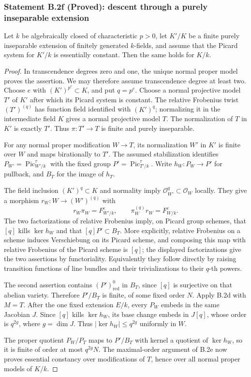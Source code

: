 \subsubsection*{Statement B.2f (Proved): descent through a purely inseparable extension}
Let $k$ be algebraically closed of characteristic $p>0$, let $K'/K$
be a finite purely inseparable extension of finitely generated
$k$-fields, and assume that the Picard system for $K'/k$ is
essentially constant.  Then the same holds for $K/k$.
\begin{proof}
In transcendence degrees zero and one, the unique normal proper model
proves the assertion.  We may therefore assume transcendence degree at
least two.  Choose $e$ with $(K')^{p^e}\subset K$, and put $q=p^e$.
Choose a normal projective model $T'$ of $K'$ after which its
Picard system is constant.  The relative Frobenius twist
$(T')^{(q)}$ has function field identified with $(K')^q$;
normalizing it in the intermediate field $K$ gives a normal
projective model $T$.  The normalization of $T$ in $K'$ is
exactly $T'$.  Thus $\pi:T'\to T$ is finite and purely inseparable.

For any normal proper modification $W\to T$, its normalization
$W'$ in $K'$ is finite over $W$ and maps birationally to $T'$.
The assumed stabilization identifies
$P_{W'}=\operatorname{Pic}^{\tau}_{W'/k}$ with the fixed group
$P'=\operatorname{Pic}^{\tau}_{T'/k}$.  Write
$h_W:P_W\to P'$ for pullback, and $B_T$ for the image of $h_T$.

The field inclusion $(K')^q\subset K$ and normality imply
$\mathcal O_{W'}^q\subset\mathcal O_W$ locally.  They give a
morphism $r_W:W\to(W')^{(q)}$ with
\[
 r_W\pi_W=F^e_{W'/k},\qquad
 \pi_W^{(q)}r_W=F^e_{W/k}.
\]
The two factorizations of relative Frobenius imply, on Picard
group schemes, that $[q]$ kills $\ker h_W$ and that
$[q]P'\subset B_T$.  More explicitly, relative Frobenius on a
scheme induces Verschiebung on its Picard scheme, and composing
this map with relative Frobenius of the Picard scheme is $[q]$;
the displayed factorizations give the two assertions by
functoriality.  Equivalently they follow directly by raising
transition functions of line bundles and their trivializations
to their $q$-th powers.

The second assertion contains $(P')_{\mathrm{red}}^0$ in $B_T$,
since $[q]$ is surjective on that abelian variety.  Therefore
$P'/B_T$ is finite, of some fixed order $N$.
Apply B.2d with $M=T$.  After the one fixed extension $E/k$,
every $P_W$ embeds in the same Jacobian $J$.  Since $[q]$
kills $\ker h_W$, its base change embeds in $J[q]$, whose
order is $q^{2g}$, where $g=\dim J$.  Thus
$|\ker h_W|\le q^{2g}$ uniformly in $W$.

The proper quotient $P_W/P_T$ maps to $P'/B_T$ with kernel a
quotient of $\ker h_W$, so it is finite of order at most
$q^{2g}N$.  The maximal-order argument of B.2e now proves
essential constancy over modifications of $T$, hence over all
normal proper models of $K/k$.
\end{proof}

